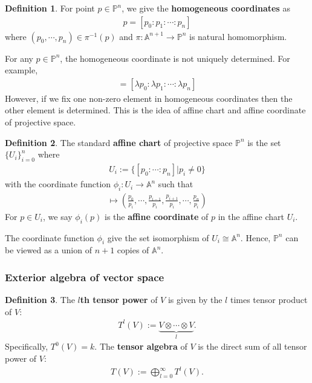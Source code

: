 \documentclass[10pt,UTF8]{article}
\theoremstyle{definition}
\newtheorem{definition}{Definition}[section]
\begin{document}
\begin{definition}
  For point $p\in \mathbb{P}^n$, we give the \textbf{ homogeneous coordinates} as 
  \begin{align*}
    p = [p_0:p_1:\cdots:p_n] 
  \end{align*}
  where $(p_0,\cdots,p_n)\in \pi^{-1}(p)$ and $\pi:\mathbb{A}^{n+1}\to \mathbb{P}^{n}$ is natural homomorphism.
\end{definition}

For any $p\in \mathbb{P}^n$, the homogeneous coordinate is not uniquely determined. For example,
\begin{align*}
  [p_0:p_1:\cdots:p_n]  = [\lambda p_0:\lambda p_1:\cdots:\lambda p_n]
\end{align*}
However, if we fix one non-zero element in homogeneous coordinates then the other element is determined. 
This is the idea of affine chart and affine coordinate of projective space.
\begin{definition}
  The standard \textbf{affine chart} of projective space $\mathbb{P}^n$ is the set $\{U_i\}_{i=0}^n$ where
  \begin{align*}
    U_i := \{[p_0:\cdots:p_n]|p_i\neq 0\} 
  \end{align*}
  with the coordinate function $\phi_i:U_i \to \mathbb{A}^{n}$ such that
  \begin{align*}
    [p_0:\cdots:p_n] \mapsto \left(\frac{p_0}{p_i},\cdots,\frac{p_{i-1}}{p_i},\frac{p_{i+1}}{p_i},\cdots,\frac{p_{n}}{p_i}\right)
  \end{align*}
  For $p\in U_i$, we say $\phi_i(p)$ is the \textbf{affine coordinate} of $p$ in the affine chart $U_i$.
\end{definition}

The coordinate function $\phi_i$ give the set isomorphism of $U_i\cong \mathbb{A}^n$. Hence, $\mathbb{P}^n$ can be viewed as 
a union of $n+1$ copies of $\mathbb{A}^n$.
 
\subsubsection{Exterior algebra of vector space}
\begin{definition}
  The \textbf{$l$th tensor power} of $V$ is given by the $l$ times tensor product of $V$:
  \begin{align*}
    T^l(V):=\underbrace{V\otimes \cdots \otimes V}_l.
  \end{align*}
  Specifically, $T^0(V)=k$.
  The \textbf{tensor algebra} of $V$ is the direct sum of all tensor power of $V$:
  \begin{align*}
    T(V) := \bigoplus_{l=0}^{\infty} T^l(V).
  \end{align*}
\end{definition}
\end{document}
